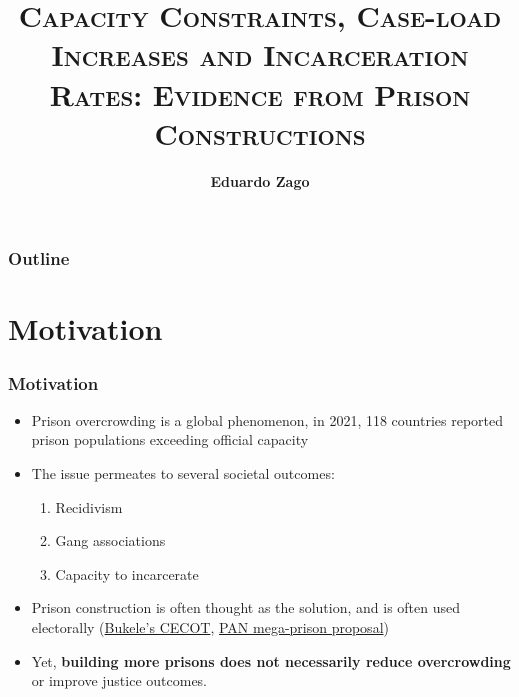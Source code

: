 \documentclass[12pt]{beamer}
\title{\Large\textsc{Capacity Constraints, Case-load Increases and Incarceration Rates: Evidence from Prison Constructions}}
\author[Zago] %
{\textbf{Eduardo Zago}\inst{1}}
\institute []%
{  \inst{1} NYU}
\date{\textsc{}}
\begin{document}
\maketitle



\begin{frame}\frametitle{Outline}
\tableofcontents %
\end{frame}






\section{Motivation}

\begin{frame}
\frametitle{Motivation}

\small
\begin{itemize}
\item  Prison overcrowding is a global phenomenon, in 2021, 118 countries reported prison populations exceeding official capacity \citep{GlobalPrisonTrends}
\item The issue permeates to several societal outcomes:
\begin{enumerate}
    \item Recidivism \citep{Tobon}
    \item Gang associations \citep{BayerP}
    \item Capacity to incarcerate
\end{enumerate}
\item Prison construction is often thought as the solution, and is often used electorally (\href{https://www.npr.org/2025/03/17/g-s1-54206/el-salvador-mega-prison-cecot}{Bukele's CECOT}, \href{https://english.elpais.com/international/2024-03-08/public-safety-is-emerging-as-a-key-campaign-issue-in-the-battle-between-the-ruling-party-and-the-opposition-in-mexico.html#}{PAN mega-prison proposal})
\item Yet, \textbf{building more prisons does not necessarily reduce overcrowding} or improve justice outcomes.


\end{itemize}
\end{frame}
\end{document}
